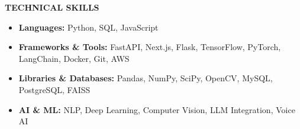 \documentclass[a4paper,10pt]{article}
\newcommand{\resheading}[1]{%
  \vspace{1em}%
  \noindent\colorbox{mygrey}{%
    \parbox{\dimexpr\linewidth-2\fboxsep\relax}{%
      \textbf{#1}%
    }%
  }%
  \vspace{0.6em}%
}
\begin{document}
\resheading{TECHNICAL SKILLS}
\vspace{0.4em}
\begin{itemize}
  \item \textbf{Languages:} Python, SQL, JavaScript
  \item \textbf{Frameworks \& Tools:} FastAPI, Next.js, Flask, TensorFlow, PyTorch, LangChain, Docker, Git, AWS
  \item \textbf{Libraries \& Databases:} Pandas, NumPy, SciPy, OpenCV, MySQL, PostgreSQL, FAISS
  \item \textbf{AI \& ML:} NLP, Deep Learning, Computer Vision, LLM Integration, Voice AI
\end{itemize}
\end{document}

